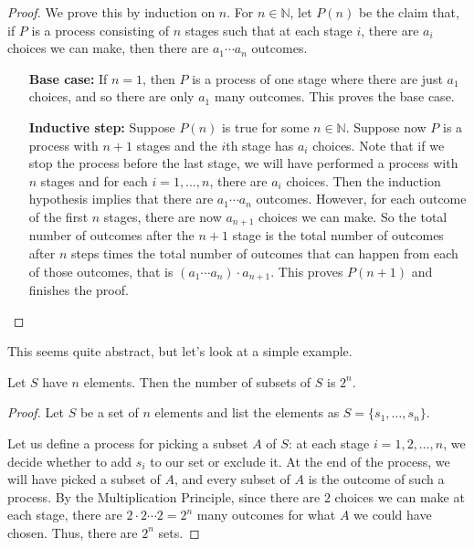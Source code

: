 \documentclass[11pt,dvipsnames]{book}
\numberwithin{figure}{section} %
\numberwithin{table}{section} %
\begin{document}
\begin{proof}
We prove this by induction on $n$. For $n\in \mathbb{N}$, let $P(n)$ be the claim that, if $P$ is a process consisting of $n$ stages such that at each stage $i$, there are $a_{i}$ choices we can make, then there are $a_{1}\cdots a_{n}$ outcomes.
\begin{itemize}
\item[{\bf Base case:}] If $n=1$, then $P$ is a process of one stage where there are just $a_{1}$ choices, and so there are only $a_{1}$ many outcomes. This proves the base case.
\item[{\bf Inductive step:}] Suppose $P(n)$ is true for some $n\in \mathbb{N}$. Suppose now $P$ is a process with $n+1$ stages and the $i$th stage has $a_{i}$ choices. Note that if we stop the process before the last stage, we will have performed a process with $n$ stages and for each $i=1, \dots ,n$, there are $a_{i}$ choices. Then the induction hypothesis implies that there are $a_{1}\cdots a_{n}$ outcomes. However, for each outcome of the first $n$ stages, there are now $a_{n+1}$ choices we can make. So the total number of outcomes after the $n+1$ stage is the total number of outcomes after $n$ steps times the total number of outcomes that can happen from each of those outcomes, that is $(a_{1}\cdots a_{n})\cdot a_{n+1}$. This proves $P(n+1)$ and finishes the proof.
\end{itemize}
\end{proof}

This seems quite abstract, but let's look at a simple example.

\begin{proposition}
\label{c:1}
Let $S$ have $n$ elements. Then the number of subsets of $S$ is $2^{n}$.
\end{proposition}

\begin{proof}
Let $S$ be a set of $n$ elements and list the elements as $S=\{s_{1}, \dots ,s_{n}\}$.

Let us define a process for picking a subset $A$ of $S$: at each stage $i=1,2,\dots ,n$, we decide whether to add $s_{i}$ to our set or exclude it. At the end of the process, we will have picked a subset of $A$, and every subset of $A$ is the outcome of such a process. By the Multiplication Principle, since there are $2$ choices we can make at each stage, there are $2\cdot 2\cdots 2=2^{n}$ many outcomes for what $A$ we could have chosen. Thus, there are $2^{n}$ sets.
\end{proof}
\end{document}
